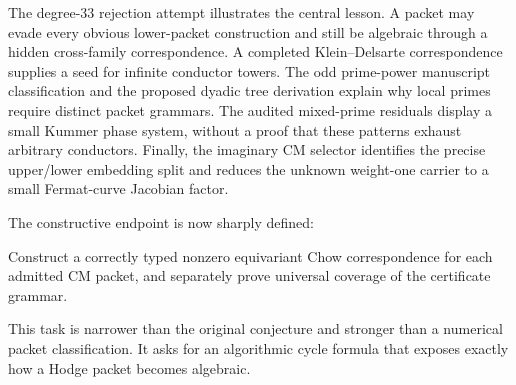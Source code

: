 The degree-33 rejection attempt illustrates the central lesson. A packet may evade every obvious lower-packet construction and still be algebraic through a hidden cross-family correspondence. A completed Klein--Delsarte correspondence supplies a seed for infinite conductor towers. The odd prime-power manuscript classification and the proposed dyadic tree derivation explain why local primes require distinct packet grammars. The audited mixed-prime residuals display a small Kummer phase system, without a proof that these patterns exhaust arbitrary conductors. Finally, the imaginary CM selector identifies the precise upper/lower embedding split and reduces the unknown weight-one carrier to a small Fermat-curve Jacobian factor.

The constructive endpoint is now sharply defined:
\begin{resultbox}
Construct a correctly typed nonzero equivariant Chow correspondence for each admitted CM packet, and separately prove universal coverage of the certificate grammar.
\end{resultbox}
This task is narrower than the original conjecture and stronger than a numerical packet classification. It asks for an algorithmic cycle formula that exposes exactly how a Hodge packet becomes algebraic.



